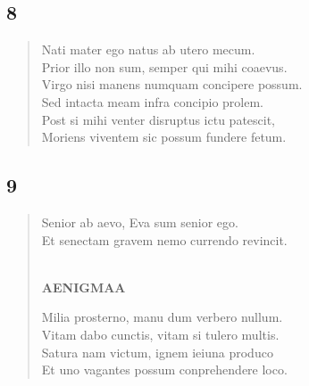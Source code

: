 \documentclass[11pt, a4paper]{report}
\begin{document}
            \subsection*{8}
      \begin{verse}
      Nati mater ego natus ab utero mecum. \\ Prior illo non sum, semper qui mihi coaevus. \\ Virgo nisi manens numquam concipere possum. \\ Sed intacta meam infra concipio prolem. \\ Post si mihi venter disruptus ictu patescit, \\ Moriens viventem sic possum fundere fetum. \\ 
      \end{verse}
  
            \subsection*{9}
      \begin{verse}
      Senior ab aevo, Eva sum senior ego. \\ Et senectam gravem nemo currendo revincit. \\ 
        ﻿\pagebreak 
    \begin{center} \textbf{AENIGMAA} \end{center} \marginpar{[354]} Milia prosterno, manu dum verbero nullum. \\ Vitam dabo cunctis, vitam si tulero multis. \\ Satura nam victum, ignem ieiuna produco \\ Et uno vagantes possum conprehendere loco. \\ 
      \end{verse}
  
\end{document}
